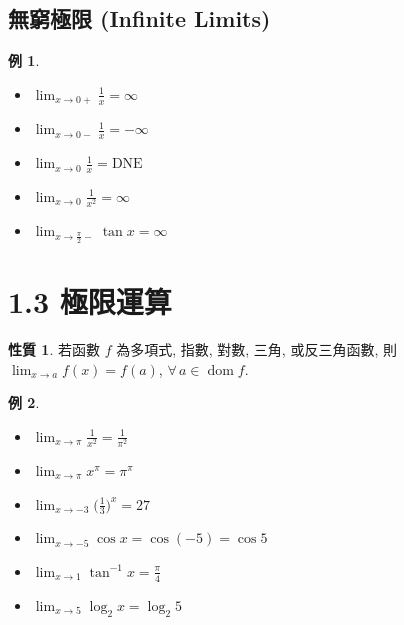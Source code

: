 \documentclass[12pt]{extarticle}
\newcommand{\ds}{\displaystyle}
\DeclareMathOperator*{\dom}{dom}
\theoremstyle{definition}
\newtheorem*{prp}{性質}
\newtheorem*{ex}{例}
\begin{document}
\subsection*{無窮極限 (Infinite Limits) }
\begin{ex}
  \setlength{\columnsep}{-20mm}
  \begin{multicols}{5}
    \begin{itemize}\setlength\itemsep{0em}
      \item $\ds\lim_{x\to0+}\frac{1}{x} = \infty$
      \item $\ds\lim_{x\to0-}\frac{1}{x} = -\infty$
      \item $\ds\lim_{x\to0}\frac{1}{x} = \text{DNE}$
      \item $\ds\lim_{x\to0}\frac{1}{x^2} = \infty$
      \item $\ds\lim_{x\to\frac{\pi}{2}-}\tan x = \infty$
    \end{itemize}
  \end{multicols}
\end{ex}

\section*{1.3 極限運算}

\begin{prp}
  若函數 $f$ 為多項式, 指數, 對數, 三角, 或反三角函數, 則 $\ds\lim_{x\to a}f(x) = f(a)$, $\forall\,a\in\dom f$.
\end{prp}

\begin{ex}
  \begin{multicols}{3}
    \begin{itemize}\setlength\itemsep{0em}
      \item $\ds\lim_{x\to\pi} \frac{1}{x^2} = \frac{1}{\pi^2}$
      \item $\ds\lim_{x\to\pi} x^{\pi} = {\pi}^\pi$
      \item $\ds\lim_{x\to -3} \Big(\frac{1}{3}\Big)^{x} = 27$
      \item $\ds\lim_{x\to -5}\cos x = \cos(-5) = \cos 5$
      \item $\ds\lim_{x\to 1}\tan^{-1} x = \frac{\pi}{4}$
      \item $\ds\lim_{x\to 5}\log_2 x = \log_2 5$%
    \end{itemize}
  \end{multicols}
\end{ex}
\end{document}
